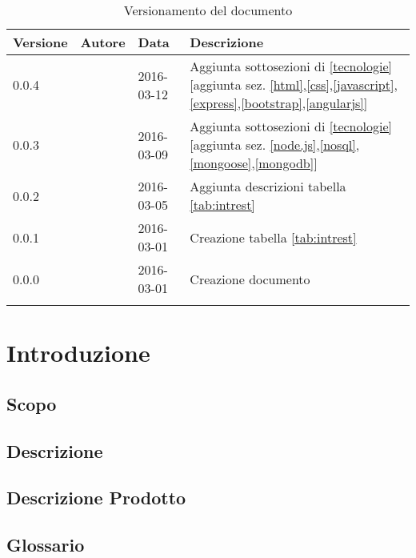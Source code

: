 \documentclass[12pt,a4paper]{article}
\begin{document}
\begin{center}
	\begin{longtable}[H]{p{} p{} p{} p{}}
		\toprule
		\textbf{Versione}	&	\textbf{Autore}	&	\textbf{Data}	&	\textbf{Descrizione}\\*
		\midrule
		\midrule
		0.0.4 & \AVE{} & 2016-03-12 & Aggiunta sottosezioni di \ref{tecnologie} [aggiunta sez. \ref{html},\ref{css},\ref{javascript},\ref{express},\ref{bootstrap},\ref{angularjs}]  \\*
		\midrule
		0.0.3 & \AVE{} & 2016-03-09 & Aggiunta sottosezioni di \ref{tecnologie} [aggiunta sez. \ref{node.js},\ref{nosql},\ref{mongoose},\ref{mongodb}]  \\*
		\midrule
		0.0.2 & \AVI{} & 2016-03-05 &  Aggiunta descrizioni tabella \ref{tab:intrest} \\*
		\midrule
		0.0.1 & \NDC{} & 2016-03-01 &  Creazione tabella \ref{tab:intrest} \\*
		\midrule
		0.0.0 & \NDC{} & 2016-03-01 &  Creazione documento \\*
		\bottomrule
		\caption{Versionamento del documento}
		\label{tabVers1} 
	\end{longtable}
\end{center}

\newpage
\tableofcontents
\newpage
\listoftables
\listoffigures
\newpage

\section{Introduzione}

\subsection{Scopo}


\subsection{Descrizione}


\subsection{Descrizione Prodotto}
\descrizioneProdotto

\subsection{Glossario}\label{glossario}
\glossarioPrint
\end{document}
